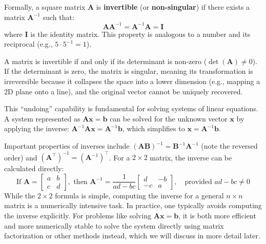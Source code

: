 Formally, a square matrix $ \mathbf{A} $ is \textbf{invertible} (or \textbf{non-singular}) if there exists a matrix $ \mathbf{A}^{-1} $ such that:
\begin{equation*}
    \mathbf{A}\mathbf{A}^{-1} = \mathbf{A}^{-1}\mathbf{A} = \mathbf{I}
\end{equation*}
where $ \mathbf{I} $ is the identity matrix. This property is analogous to a number and its reciprocal (e.g., $ 5 \cdot 5^{-1} = 1 $).

A matrix is invertible if and only if its determinant is non-zero ($ \det(\mathbf{A}) \neq 0 $). If the determinant is zero, the matrix is singular, meaning its transformation is irreversible because it collapses the space into a lower dimension (e.g., mapping a 2D plane onto a line), and the original vector cannot be uniquely recovered.

This ``undoing'' capability is fundamental for solving systems of linear equations. A system represented as $ \mathbf{A}\mathbf{x} = \mathbf{b} $ can be solved for the unknown vector $ \mathbf{x} $ by applying the inverse: $ \mathbf{A}^{-1}\mathbf{A}\mathbf{x} = \mathbf{A}^{-1}\mathbf{b} $, which simplifies to $ \mathbf{x} = \mathbf{A}^{-1}\mathbf{b} $.

Important properties of inverses include $(\mathbf{A}\mathbf{B})^{-1} = \mathbf{B}^{-1}\mathbf{A}^{-1}$ (note the reversed order) and $(\mathbf{A}^\top)^{-1} = (\mathbf{A}^{-1})^\top$. For a $2\times 2$ matrix, the inverse can be calculated directly:
\begin{equation*}
    \text{If } \mathbf{A} = \begin{bmatrix} a & b \\ c & d \end{bmatrix}, \text{ then } \mathbf{A}^{-1} = \frac{1}{ad-bc} \begin{bmatrix} d & -b \\ -c & a \end{bmatrix}, \quad \text{provided } ad-bc \neq 0
\end{equation*}
While the $2 \times 2$ formula is simple, computing the inverse for a general $n \times n$ matrix is a numerically intensive task. In practice, one typically avoids computing the inverse explicitly. For problems like solving $\mathbf{A}\mathbf{x} = \mathbf{b}$, it is both more efficient and more numerically stable to solve the system directly using matrix factorization or other methods instead, which we will discuss in more detail later.




